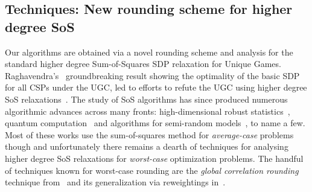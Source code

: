 \subsection{Techniques: New rounding scheme for higher degree SoS}
Our algorithms are obtained via a novel rounding scheme and analysis for the standard higher degree Sum-of-Squares SDP relaxation for Unique Games. Raghavendra's~\cite{Raghavendra08} groundbreaking result showing the optimality of the basic SDP for all CSPs under the UGC, led to efforts to refute the UGC using higher degree SoS relaxations~\cite{Lasserre00,Parrilo00}. The study of SoS algorithms has since produced numerous algorithmic advances across many fronts: high-dimensional robust statistics~\cite{BarakKS14,ma2016polynomial, BakshiDHKKK20, BakshiDJKKV22}, quantum computation~\cite{BKS17} and algorithms for semi-random models~\cite{BuhaiKS22}, to name a few. Most of these works use the sum-of-squares method for \emph{average-case} problems though and unfortunately there remains a dearth of techniques for analysing higher degree SoS relaxations for \emph{worst-case} optimization problems. The handful of techniques known for worst-case rounding are the \emph{global correlation rounding} technique from~\cite{BarakRS11,RT12} and its generalization via reweightings in~\cite{BKS17}.

